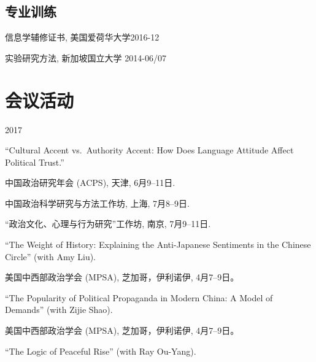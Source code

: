 \documentclass[10.5pt,]{article}
\providecommand{\tightlist}{%
	\setlength{\itemsep}{0pt}\setlength{\parskip}{0pt}}
\renewenvironment{itemize}{
	\begin{list}{}{
			\setlength{\leftmargin}{1.5em}
		}
	}{
	\end{list}
}
\begin{document}
\subsection{专业训练}

\begin{itemize}
\tightlist
\item
  信息学辅修证书, 美国爱荷华大学\hfill 2016-12
\item
  实验研究方法, 新加坡国立大学 \hfill 2014-06/07
\end{itemize}

\section{会议活动}

\begin{itemize}
\tightlist
\item
  2017

  \begin{itemize}
  \tightlist
  \item
    ``Cultural Accent vs.~Authority Accent: How Does Language Attitude
    Affect Political Trust.''

    \begin{itemize}
    \tightlist
    \item
      \footnotesize 中国政治研究年会 (ACPS), 天津, 6月9--11日.
    \item
      \footnotesize 中国政治科学研究与方法工作坊, 上海, 7月8--9日.
    \item
      \footnotesize ``政治文化、心理与行为研究''工作坊, 南京,
      7月9--11日.
    \end{itemize}
  \item
    ``The Weight of History: Explaining the Anti-Japanese Sentiments in
    the Chinese Circle'' (with Amy Liu).

    \begin{itemize}
    \tightlist
    \item
      \footnotesize 美国中西部政治学会 (MPSA), 芝加哥，伊利诺伊,
      4月7--9日。
    \end{itemize}
  \item
    ``The Popularity of Political Propaganda in Modern China: A Model of
    Demands'' (with Zijie Shao).

    \begin{itemize}
    \tightlist
    \item
      \footnotesize 美国中西部政治学会 (MPSA), 芝加哥，伊利诺伊,
      4月7--9日。
    \end{itemize}
  \item
    ``The Logic of Peaceful Rise'' (with Ray Ou-Yang).


\end{itemize}
\end{itemize}
\end{document}
